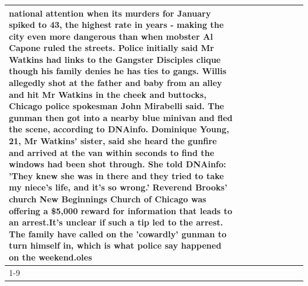 \begin{table}[H]
\begin{tabular}{lllrlllll}
national attention when its murders for January spiked to 43, the highest rate in years - making the city even more dangerous than when mobster Al Capone ruled the streets. Police initially said Mr Watkins had links to the Gangster Disciples clique though his family denies he has ties to gangs. Willis allegedly shot at the father and baby from an alley and hit Mr Watkins in the cheek and buttocks, Chicago police spokesman John Mirabelli said. The gunman then got into a nearby blue minivan and fled the scene, according to DNAinfo. Dominique Young, 21, Mr Watkins' sister, said she heard the gunfire and arrived at the van within seconds to find the windows had been shot through. She told DNAinfo: 'They knew she was in there and they tried to take my niece's life, and it's so wrong.' Reverend Brooks' church New Beginnings Church of Chicago was offering a \$5,000 reward for information that leads to an arrest.It's unclear if such a tip led to the arrest. The family have called on the 'cowardly' gunman to turn himself in, which is what police say happened on the weekend.oles \\
\cline{1-9}

\end{tabular}
\end{table}
